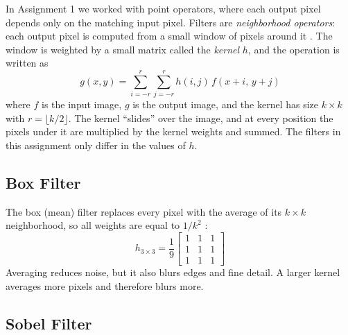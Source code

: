 In Assignment 1 we worked with point operators, where each output pixel
depends only on the matching input pixel. Filters are
\emph{neighborhood operators}: each output pixel is computed from a
small window of pixels around it \citep{szeliski2022}. The window is
weighted by a small matrix called the \emph{kernel} $h$, and the
operation is written as
\begin{equation}
  g(x,y) = \sum_{i=-r}^{r} \sum_{j=-r}^{r} h(i,j)\, f(x+i,\, y+j)
  \label{eq:correlation}
\end{equation}
where $f$ is the input image, $g$ is the output image, and the kernel
has size $k \times k$ with $r = \lfloor k/2 \rfloor$. The kernel
``slides'' over the image, and at every position the pixels under it are
multiplied by the kernel weights and summed. The filters in this
assignment only differ in the values of $h$.

\subsection{Box Filter}

The box (mean) filter replaces every pixel with the average of its
$k \times k$ neighborhood, so all weights are equal to $1/k^2$
\citep{gonzalez2018}:
\begin{equation}
  h_{3\times3} = \frac{1}{9}
  \begin{bmatrix} 1 & 1 & 1 \\ 1 & 1 & 1 \\ 1 & 1 & 1 \end{bmatrix}
  \label{eq:box}
\end{equation}
Averaging reduces noise, but it also blurs edges and fine detail. A
larger kernel averages more pixels and therefore blurs more.

\subsection{Sobel Filter}

